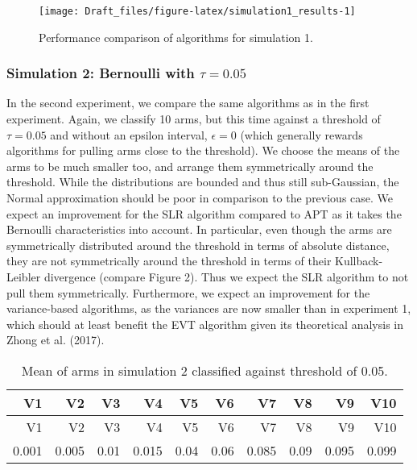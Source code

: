 \documentclass[11pt,]{article}
\begin{document}
\begin{figure}

{\centering \texttt{[image: Draft\_files/figure-latex/simulation1\_results-1]} 

}

\caption{Performance comparison of algorithms for simulation 1.}\label{fig:simulation1_results}
\end{figure}

\subsubsection{\texorpdfstring{Simulation 2: Bernoulli with
\(\tau = 0.05\)
\label{sec:Simulation2}}{Simulation 2: Bernoulli with \textbackslash{}tau = 0.05 }}\label{simulation-2-bernoulli-with-tau-0.05}

In the second experiment, we compare the same algorithms as in the first
experiment. Again, we classify 10 arms, but this time against a
threshold of \(\tau = 0.05\) and without an epsilon interval,
\(\epsilon = 0\) (which generally rewards algorithms for pulling arms
close to the threshold). We choose the means of the arms to be much
smaller too, and arrange them symmetrically around the threshold. While
the distributions are bounded and thus still sub-Gaussian, the Normal
approximation should be poor in comparison to the previous case. We
expect an improvement for the SLR algorithm compared to APT as it takes
the Bernoulli characteristics into account. In particular, even though
the arms are symmetrically distributed around the threshold in terms of
absolute distance, they are not symmetrically around the threshold in
terms of their Kullback-Leibler divergence (compare Figure 2). Thus we
expect the SLR algorithm to not pull them symmetrically. Furthermore, we
expect an improvement for the variance-based algorithms, as the
variances are now smaller than in experiment 1, which should at least
benefit the EVT algorithm given its theoretical analysis in Zhong et al.
(2017).

\begin{longtable}[]{@{}rrrrrrrrrr@{}}
\caption{Mean of arms in simulation 2 classified against threshold of
0.05.}\tabularnewline
\toprule
V1 & V2 & V3 & V4 & V5 & V6 & V7 & V8 & V9 & V10\tabularnewline
\midrule
\endfirsthead
\toprule
V1 & V2 & V3 & V4 & V5 & V6 & V7 & V8 & V9 & V10\tabularnewline
\midrule
\endhead
0.001 & 0.005 & 0.01 & 0.015 & 0.04 & 0.06 & 0.085 & 0.09 & 0.095 &
0.099\tabularnewline
\bottomrule
\end{longtable}
\end{document}
